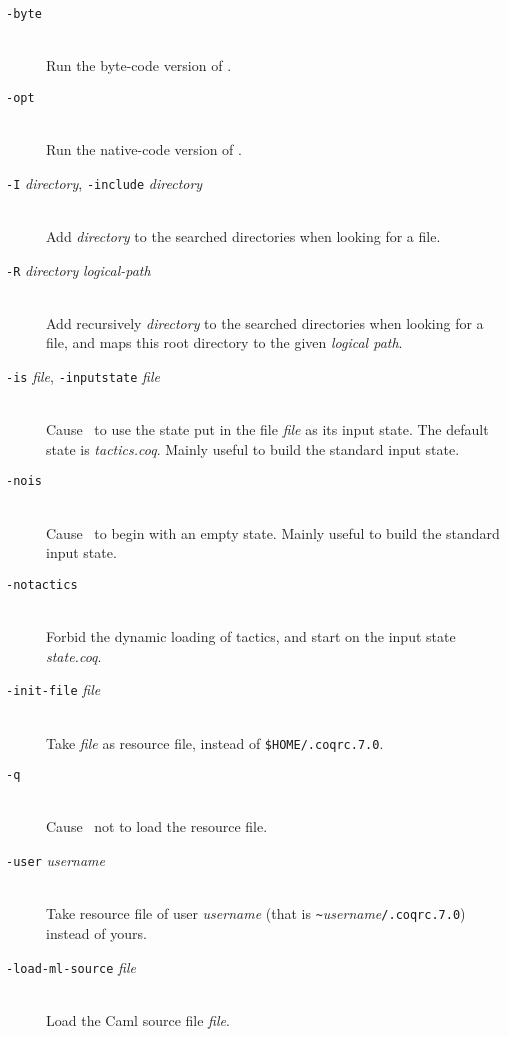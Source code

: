 \begin{description}
\item[{\tt -byte}]\ \\
  Run the byte-code version of \Coq{}.

\item[{\tt -opt}]\ \\
  Run the native-code version of \Coq{}.

\item[{\tt -I} {\em directory}, {\tt -include} {\em directory}]\ \\
  Add {\em directory} to the searched directories when looking for a
  file.

\item[{\tt -R} {\em directory} {\em logical-path}]\ \\
  Add recursively {\em directory} to the searched directories when looking for
  a file, and maps this root directory to the given {\em logical path}.

\item[{\tt -is} {\em file}, {\tt -inputstate} {\em file}]\ \\
  Cause \Coq~to use the state put in the file {\em file} as its input
  state. The default state is {\em tactics.coq}.
  Mainly useful to build the standard input state.

\item[{\tt -nois}]\ \\
  Cause \Coq~to begin with an empty state. Mainly useful to build the
  standard input state.

\item[{\tt -notactics}]\ \\
  Forbid the dynamic loading of tactics, and start on the input state
  {\em state.coq}.

\item[{\tt -init-file} {\em file}]\ \\
  Take {\em file} as resource file, instead of {\tt \$HOME/.coqrc.7.0}.

\item[{\tt -q}]\ \\
  Cause \Coq~not to load the resource file.

\item[{\tt -user} {\em username}]\ \\
  Take resource file of user {\em username} (that is 
  \verb+~+{\em username}{\tt /.coqrc.7.0}) instead of yours.

\item[{\tt -load-ml-source} {\em file}]\ \\
  Load the Caml source file {\em file}.


\end{description}
